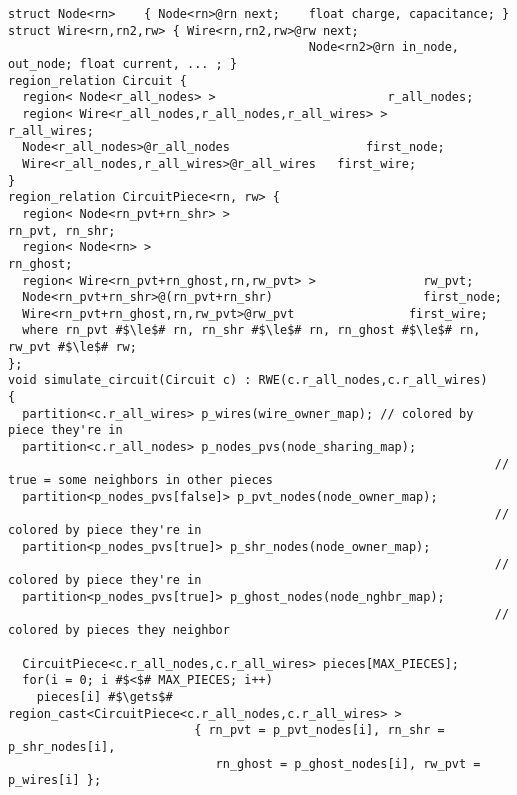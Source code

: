 \begin{lstlisting}[float={t},label={lst:code_ex},caption={Circuit Simulation Code Example}]
struct Node<rn>    { Node<rn>@rn next;    float charge, capacitance; }
struct Wire<rn,rn2,rw> { Wire<rn,rn2,rw>@rw next;
                                          Node<rn2>@rn in_node, out_node; float current, ... ; }
region_relation Circuit {
  region< Node<r_all_nodes> >                        r_all_nodes;
  region< Wire<r_all_nodes,r_all_nodes,r_all_wires> >       r_all_wires;
  Node<r_all_nodes>@r_all_nodes                   first_node;
  Wire<r_all_nodes,r_all_wires>@r_all_wires   first_wire;
}
region_relation CircuitPiece<rn, rw> {
  region< Node<rn_pvt+rn_shr> >                                 rn_pvt, rn_shr;
  region< Node<rn> >                                                   rn_ghost;
  region< Wire<rn_pvt+rn_ghost,rn,rw_pvt> >               rw_pvt;
  Node<rn_pvt+rn_shr>@(rn_pvt+rn_shr)                     first_node;
  Wire<rn_pvt+rn_ghost,rn,rw_pvt>@rw_pvt                first_wire;
  where rn_pvt #$\le$# rn, rn_shr #$\le$# rn, rn_ghost #$\le$# rn, rw_pvt #$\le$# rw;
};
void simulate_circuit(Circuit c) : RWE(c.r_all_nodes,c.r_all_wires)
{
  partition<c.r_all_wires> p_wires(wire_owner_map); // colored by piece they're in
  partition<c.r_all_nodes> p_nodes_pvs(node_sharing_map);
                                                                    // true = some neighbors in other pieces
  partition<p_nodes_pvs[false]> p_pvt_nodes(node_owner_map);
                                                                    // colored by piece they're in
  partition<p_nodes_pvs[true]> p_shr_nodes(node_owner_map);
                                                                    // colored by piece they're in
  partition<p_nodes_pvs[true]> p_ghost_nodes(node_nghbr_map);
                                                                    // colored by pieces they neighbor

  CircuitPiece<c.r_all_nodes,c.r_all_wires> pieces[MAX_PIECES];
  for(i = 0; i #$<$# MAX_PIECES; i++) 
    pieces[i] #$\gets$# region_cast<CircuitPiece<c.r_all_nodes,c.r_all_wires> >
                          { rn_pvt = p_pvt_nodes[i], rn_shr = p_shr_nodes[i],
                             rn_ghost = p_ghost_nodes[i], rw_pvt = p_wires[i] };


\end{lstlisting}

